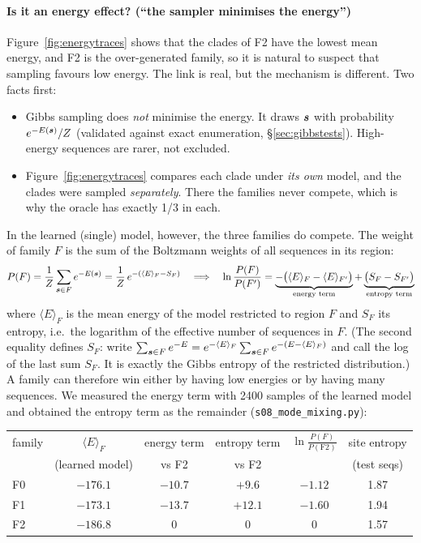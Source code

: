\paragraph{Is it an energy effect? (``the sampler minimises the energy'')} Figure~\ref{fig:energytraces} shows that the clades of
F2 have the lowest mean energy, and F2 is the over-generated family, so it is natural to suspect that
sampling favours low energy. The link is real, but the mechanism is different. Two facts first:
\begin{itemize}[nosep]
\item Gibbs sampling does \emph{not} minimise the energy. It draws $\bm{s}$ with probability $e^{-E(\bm{s})}/Z$
(validated against exact enumeration, \S\ref{sec:gibbstests}). High-energy sequences are rarer, not
excluded.
\item Figure~\ref{fig:energytraces} compares each clade under \emph{its own} model, and the clades were sampled
\emph{separately}. There the families never compete, which is why the oracle has exactly 1/3 in each.
\end{itemize}
In the learned (single) model, however, the three families do compete. The weight of family $F$ is the sum of
the Boltzmann weights of all sequences in its region:
\begin{equation}\label{eq:freeenergy}
P(F)=\frac1Z\sum_{\bm{s}\in F}e^{-E(\bm{s})}=\frac1Z\,e^{-(\langle E\rangle_F-S_F)}
\quad\Longrightarrow\quad
\ln\frac{P(F)}{P(F')}=\underbrace{-\big(\langle E\rangle_F-\langle E\rangle_{F'}\big)}_{\text{energy term}}
+\underbrace{\big(S_F-S_{F'}\big)}_{\text{entropy term}}
\end{equation}
where $\langle E\rangle_F$ is the mean energy of the model restricted to region $F$ and $S_F$ its entropy,
i.e.\ the logarithm of the effective number of sequences in $F$. (The second equality defines $S_F$: write
$\sum_{\bm{s}\in F}e^{-E}=e^{-\langle E\rangle_F}\sum_{\bm{s}\in F}e^{-(E-\langle E\rangle_F)}$ and call the log of the
last sum $S_F$. It is exactly the Gibbs entropy of the restricted distribution.) A family can therefore win
either by having low energies or by having many sequences. We measured the energy term with 2400 samples of the
learned model and obtained the entropy term as the remainder (\texttt{s08\_mode\_mixing.py}):
\begin{center}\small
\begin{tabular}{lccccc}
\toprule
family & $\langle E\rangle_F$ & energy term & entropy term & $\ln\frac{P(F)}{P(\text{F2})}$ & site entropy\\
 & (learned model) & vs F2 & vs F2 & & (test seqs)\\
\midrule
F0 & $-176.1$ & $-10.7$ & $+9.6$ & $-1.12$ & 1.87\\
F1 & $-173.1$ & $-13.7$ & $+12.1$ & $-1.60$ & 1.94\\
F2 & $-186.8$ & 0 & 0 & 0 & 1.57\\
\bottomrule
\end{tabular}
\end{center}
